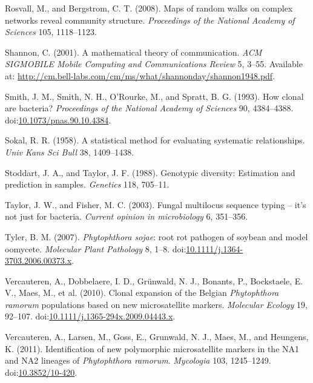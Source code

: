 \documentclass[double,12pt]{beavtex}
\begin{document}
  \hypertarget{ref-rosvall2008maps}{}
  Rosvall, M., and Bergstrom, C. T. (2008). Maps of random walks on
  complex networks reveal community structure. \emph{Proceedings of the
  National Academy of Sciences} 105, 1118--1123.
  
  \hypertarget{ref-shannon2001mathematical}{}
  Shannon, C. (2001). A mathematical theory of communication. \emph{ACM
  SIGMOBILE Mobile Computing and Communications Review} 5, 3--55.
  Available at:
  \url{http://cm.bell-labs.com/cm/ms/what/shannonday/shannon1948.pdf}.
  
  \hypertarget{ref-smith1993how}{}
  Smith, J. M., Smith, N. H., O'Rourke, M., and Spratt, B. G. (1993). How
  clonal are bacteria? \emph{Proceedings of the National Academy of
  Sciences} 90, 4384--4388.
  doi:\href{https://doi.org/10.1073/pnas.90.10.4384}{10.1073/pnas.90.10.4384}.
  
  \hypertarget{ref-sokal1958statistical}{}
  Sokal, R. R. (1958). A statistical method for evaluating systematic
  relationships. \emph{Univ Kans Sci Bull} 38, 1409--1438.
  
  \hypertarget{ref-stoddart1988genotypic}{}
  Stoddart, J. A., and Taylor, J. F. (1988). Genotypic diversity:
  Estimation and prediction in samples. \emph{Genetics} 118, 705--11.
  
  \hypertarget{ref-taylor2003fungal}{}
  Taylor, J. W., and Fisher, M. C. (2003). Fungal multilocus sequence
  typing -- it's not just for bacteria. \emph{Current opinion in
  microbiology} 6, 351--356.
  
  \hypertarget{ref-tyler2007phytophthora}{}
  Tyler, B. M. (2007). \emph{Phytophthora sojae}: root rot pathogen of
  soybean and model oomycete. \emph{Molecular Plant Pathology} 8, 1--8.
  doi:\href{https://doi.org/10.1111/j.1364-3703.2006.00373.x}{10.1111/j.1364-3703.2006.00373.x}.
  
  \hypertarget{ref-vercauteren2010clonal}{}
  Vercauteren, A., Dobbelaere, I. D., Grünwald, N. J., Bonants, P.,
  Bockstaele, E. V., Maes, M., et al. (2010). Clonal expansion of the
  Belgian \emph{Phytophthora ramorum} populations based on new
  microsatellite markers. \emph{Molecular Ecology} 19, 92--107.
  doi:\href{https://doi.org/10.1111/j.1365-294x.2009.04443.x}{10.1111/j.1365-294x.2009.04443.x}.
  
  \hypertarget{ref-vercauteren2011identification}{}
  Vercauteren, A., Larsen, M., Goss, E., Grunwald, N. J., Maes, M., and
  Heungens, K. (2011). Identification of new polymorphic microsatellite
  markers in the NA1 and NA2 lineages of \emph{Phytophthora ramorum}.
  \emph{Mycologia} 103, 1245--1249.
  doi:\href{https://doi.org/10.3852/10-420}{10.3852/10-420}.
  
\end{document}
